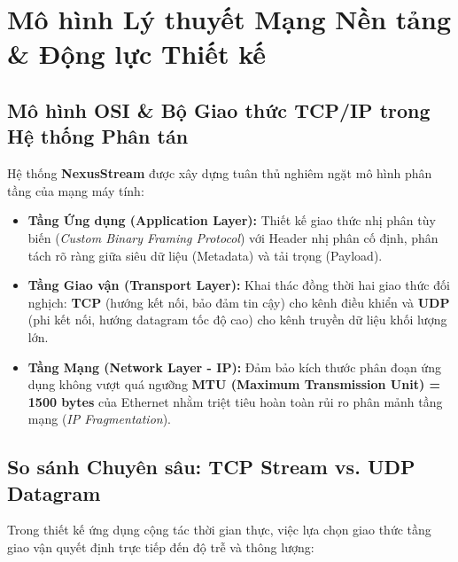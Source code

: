 \documentclass[11pt,a4paper]{article}
\begin{document}
\tableofcontents
\newpage

\section{Mô hình Lý thuyết Mạng Nền tảng \& Động lực Thiết kế}

\subsection{Mô hình OSI \& Bộ Giao thức TCP/IP trong Hệ thống Phân tán}
Hệ thống \textbf{NexusStream} được xây dựng tuân thủ nghiêm ngặt mô hình phân tầng của mạng máy tính:
\begin{itemize}
    \item \textbf{Tầng Ứng dụng (Application Layer):} Thiết kế giao thức nhị phân tùy biến (\textit{Custom Binary Framing Protocol}) với Header nhị phân cố định, phân tách rõ ràng giữa siêu dữ liệu (Metadata) và tải trọng (Payload).
    \item \textbf{Tầng Giao vận (Transport Layer):} Khai thác đồng thời hai giao thức đối nghịch: \textbf{TCP} (hướng kết nối, bảo đảm tin cậy) cho kênh điều khiển và \textbf{UDP} (phi kết nối, hướng datagram tốc độ cao) cho kênh truyền dữ liệu khối lượng lớn.
    \item \textbf{Tầng Mạng (Network Layer - IP):} Đảm bảo kích thước phân đoạn ứng dụng không vượt quá ngưỡng \textbf{MTU (Maximum Transmission Unit) = 1500 bytes} của Ethernet nhằm triệt tiêu hoàn toàn rủi ro phân mảnh tầng mạng (\textit{IP Fragmentation}).
\end{itemize}

\subsection{So sánh Chuyên sâu: TCP Stream vs. UDP Datagram}
Trong thiết kế ứng dụng cộng tác thời gian thực, việc lựa chọn giao thức tầng giao vận quyết định trực tiếp đến độ trễ và thông lượng:
\end{document}
